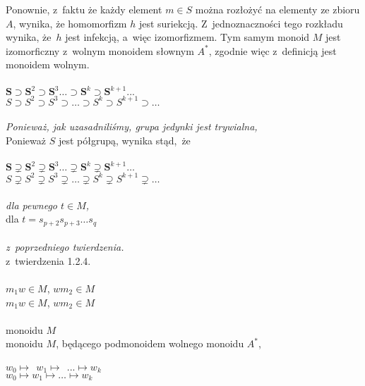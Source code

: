\documentclass[a4paper,11pt]{article}
\begin{document}
\Powin Ponownie, z~faktu że każdy element $m \in S$ można rozłożyć na
  elementy ze zbioru $A$, wynika, że homomorfizm $h$ jest suriekcją.
  Z~jednoznaczności tego rozkładu wynika, że~$h$ jest infekcją, a~więc
  izomorfizmem. Tym samym monoid $M$ jest izomorficzny z~wolnym monoidem
  słownym $A^{ * }$, zgodnie więc z~definicją jest monoidem wolnym. \\
 \\
\Jest  $\mathbf{S} \supset \mathbf{S}^{ 2 } \supset \mathbf{S}^{ 3 } \ldots
\supset \mathbf{S}^{ k } \supset \mathbf{S}^{ k + 1 } ...$ \\
\Powin $S \supset S^{ 2 } \supset S^{ 3 } \supset \ldots \supset S^{ k } \supset S^{ k + 1 } \supset \ldots$ \\
 \\
\Jest  \textit{Ponieważ, jak uzasadniliśmy, grupa jedynki jest trywialna,}
\\
\Powin Ponieważ $S$ jest półgrupą, wynika stąd,~że \\
 \\
\Jest  $\mathbf{S} \supsetneq \mathbf{S}^{ 2 } \supsetneq \mathbf{S}^{ 3 } \ldots
\supsetneq \mathbf{S}^{ k } \supsetneq \mathbf{S}^{ k + 1 } \ldots$ \\[0.3em]
\Powin $S \supsetneq S^{ 2 } \supsetneq S^{ 3 } \supsetneq \ldots \supsetneq S^{ k } \supsetneq S^{ k + 1 } \supsetneq \ldots$ \\
 \\
\Jest  \textit{dla pewnego $t \in M$,} \\
\Powin dla $t = s_{ p + 2 } s_{ p + 3 } \ldots s_{ q }$ \\
 \\
\Jest  \textit{z~poprzedniego twierdzenia.} \\
\Powin z~twierdzenia 1.2.4. \\
 \\
\Jest  $m_{ 1 } w \in M$,{ } $w m_{ 2 } \in M$ \\
\Powin $m_{ 1 } w \in M$, $w m_{ 2 } \in M$ \\
 \\
\Jest  monoidu $M$ \\
\Powin monoidu $M$, będącego podmonoidem wolnego monoidu $A^{ * }$, \\
 \\
\Jest  $w_{ 0 } \mapsto \;\, w_{ 1 } \mapsto \;\, ... \mapsto w_{ k }$ \\
\Powin $w_{ 0 } \mapsto w_{ 1 } \mapsto \ldots \mapsto w_{ k }$ \\
\end{document}
